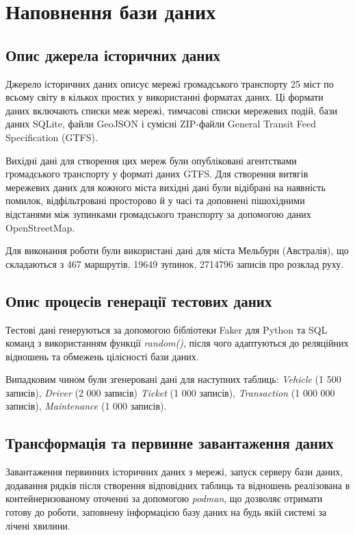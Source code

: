 \documentclass[oneside,14pt]{extarticle}
\begin{document}
\section{Наповнення бази даних}
\subsection{Опис джерела історичних даних}
Джерело історичних даних описує мережі громадського транспорту 25 міст по всьому світу в кількох простих у використанні форматах даних. Ці формати даних включають списки меж мережі, тимчасові списки мережевих подій, бази даних SQLite, файли GeoJSON і сумісні ZIP-файли General Transit Feed Specification (GTFS).

Вихідні дані для створення цих мереж були опубліковані агентствами громадського транспорту у форматі даних GTFS. Для створення витягів мережевих даних для кожного міста вихідні дані були відібрані на наявність помилок, відфільтровані просторово й у часі та доповнені пішохідними відстанями між зупинками громадського транспорту за допомогою даних OpenStreetMap.

Для виконання роботи були використані дані для міста Мельбурн (Австралія), що складаються з 467 маршрутів, 19649 зупинок, 2714796 записів про розклад руху.

\subsection{Опис процесів генерації тестових даних}
Тестові дані генеруються за допомогою бібліотеки Faker для Python та SQL команд з використанням функції \textit{random()}, після чого адаптуються до реляційних відношень та обмежень цілісності бази даних. 

Випадковим чином були згенеровані дані для наступних таблиць: \textit{Vehicle} (1 500 записів), \textit{Driver} (2 000 записів) \textit{Ticket} (1 000 записів), \textit{Transaction} (1 000 000 записів), \textit{Maintenance} (1 000 записів).

\subsection{Трансформація та первинне завантаження даних}
Завантаження первинних історичних даних з мережі, запуск серверу бази даних, додавання рядків після створення відповідних таблиць та відношень реалізована в контейнеризованому оточенні за допомогою \textit{podman}, що дозволяє отримати готову до роботи, заповнену інформацією базу даних на будь якій системі за лічені хвилини.
\end{document}
